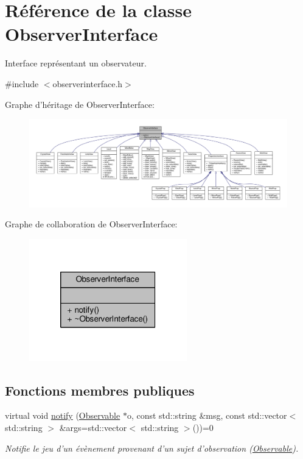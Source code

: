 \hypertarget{classObserverInterface}{\section{Référence de la classe Observer\+Interface}
\label{classObserverInterface}
}


Interface représentant un observateur.  




{\ttfamily \#include $<$observerinterface.\+h$>$}



Graphe d'héritage de Observer\+Interface\+:
\nopagebreak
\begin{figure}[H]
\begin{center}
\leavevmode
\includegraphics[width=350pt]{d7/d5b/classObserverInterface__inherit__graph}
\end{center}
\end{figure}


Graphe de collaboration de Observer\+Interface\+:\nopagebreak
\begin{figure}[H]
\begin{center}
\leavevmode
\includegraphics[width=194pt]{d9/d44/classObserverInterface__coll__graph}
\end{center}
\end{figure}
\subsection*{Fonctions membres publiques}
\begin{DoxyCompactItemize}
\item 
virtual void \hyperlink{classObserverInterface_a3083639e706557f950f62af8ab283150}{notify} (\hyperlink{classObservable}{Observable} $\ast$o, const std\+::string \&msg, const std\+::vector$<$ std\+::string $>$ \&args=std\+::vector$<$ std\+::string $>$())=0
\begin{DoxyCompactList}\small\item\em Notifie le jeu d'un évènement provenant d'un sujet d'observation (\hyperlink{classObservable}{Observable}). \end{DoxyCompactList}\end{DoxyCompactItemize}


